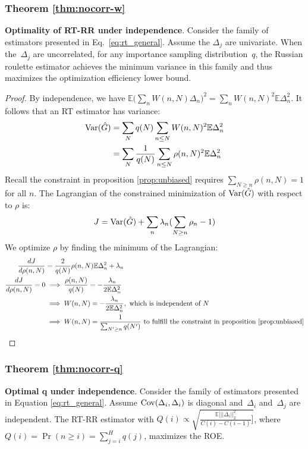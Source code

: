 \subsubsection{Theorem \ref{thm:nocorr-w}}
\textbf{Optimality of RT-RR under independence}.
Consider the family of estimators presented in Eq.~\ref{eq:rt_general}.
Assume the $\Delta_j$ are univariate.
When the~$\Delta_j$ are uncorrelated, for any importance sampling distribution~$q$, the Russian roulette estimator achieves the minimum variance in this family and thus maximizes the optimization efficiency lower bound.
\begin{proof}
By independence, we have $\mathbb{E}\big(\sum_n W(n, N) \Delta_n \big)^2 = \sum_n W(n, N)^2 \mathbb{E} \Delta_n^2$. It follows that an RT estimator has variance:
\begin{align*}
\mathrm{Var}(\hat{G}) &= \sum_N q(N) \sum_{n\leq N} W(n, N)^2 \mathbb{E} \Delta_n^2\\
&= \sum_N \frac{1}{q(N)} \sum_{n\leq N} \rho(n, N)^2 \mathbb{E} \Delta_n^2
\end{align*}
Recall the constraint in proposition \ref{prop:unbiased} requires $\sum_{N \geq n} \rho(n, N) = 1$ for all $n$. The Lagrangian of the constrained minimization of $\mathrm{Var}(\hat{G})$ with respect to $\rho$ is:
\[
J = \mathrm{Var}(\hat{G}) + \sum_n \lambda_n (\sum_{N \geq n} \rho_n - 1)
\]
We optimize $\rho$ by finding the minimum of the Lagrangian:
\begin{align*}
\frac{dJ}{d\rho(n,N)} &= \frac{2}{q(N)} \rho(n, N) \mathbb{E} \Delta_n^2 + \lambda_n \\
\frac{dJ}{d\rho(n,N)} = 0 &\implies \frac{\rho(n, N)}{q(N)} = -\frac{\lambda_n}{2 \mathbb{E} \Delta_n^2}\\
&\implies W(n, N) = -\frac{\lambda_n}{2 \mathbb{E} \Delta_n^2}, \text{ which is independent of } N\\
&\implies W(n, N) = \frac{1}{\sum_{N' \geq n} q(N')} \text{ to fulfill the constraint in proposition }\ref{prop:unbiased}
\end{align*}
\end{proof}

\subsubsection{Theorem \ref{thm:nocorr-q}}
\textbf{Optimal q under independence}.
Consider the family of estimators presented in Equation  \ref{eq:rt_general}.
Assume $\mathrm{Cov}(\Delta_i, \Delta_i)$ is diagonal and~$\Delta_i$ and~$\Delta_j$ are independent.
The RT-RR estimator with
$Q(i) \propto \sqrt{\frac{\mathbb{E} [||\Delta_i||_2^2}{C(i) - C(i-1)}]}$,
where $Q(i) = \Pr(n \geq i) = \sum_{j=i}^H q(j)$,
maximizes the ROE.

